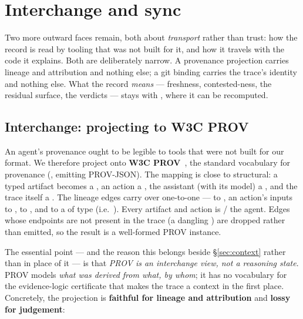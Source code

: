 \section{Interchange and sync}\label{sec:interchange}

Two more outward faces remain, both about \emph{transport} rather than trust: how the record is read by
tooling that was not built for it, and how it travels with the code it explains. Both are deliberately
narrow. A provenance projection carries lineage and attribution and nothing else; a git binding carries the
trace's identity and nothing else. What the record \emph{means} --- freshness, contested-ness, the residual
surface, the verdicts --- stays with , where it can be recomputed.

\subsection{Interchange: projecting to W3C PROV}\label{sec:interchange-prov}

An agent's provenance ought to be legible to tools that were not built for our format. We therefore project
\trace{} onto \textbf{W3C PROV}~\cite{prov}, the standard vocabulary for provenance
(, emitting PROV-JSON). The mapping is close to structural: a typed
artifact becomes a , an action a , the assistant (with its model) a
, and the trace itself a . The lineage edges carry over one-to-one ---
 to , an action's inputs to ,
 to , and  to a  of type
 (i.e.\ ). Every artifact and action is  /
 the agent. Edges whose endpoints are not present in the trace (a dangling
) are dropped rather than emitted, so the result is a well-formed PROV instance.

The essential point --- and the reason this belongs beside \S\ref{sec:context} rather than in place of it ---
is that \emph{PROV is an interchange view, not a reasoning state}. PROV models \emph{what was derived from
what, by whom}; it has no vocabulary for the evidence-logic certificate that makes the trace a context in the
first place. Concretely, the projection is \textbf{faithful for lineage and attribution} and \textbf{lossy for
judgement}:


